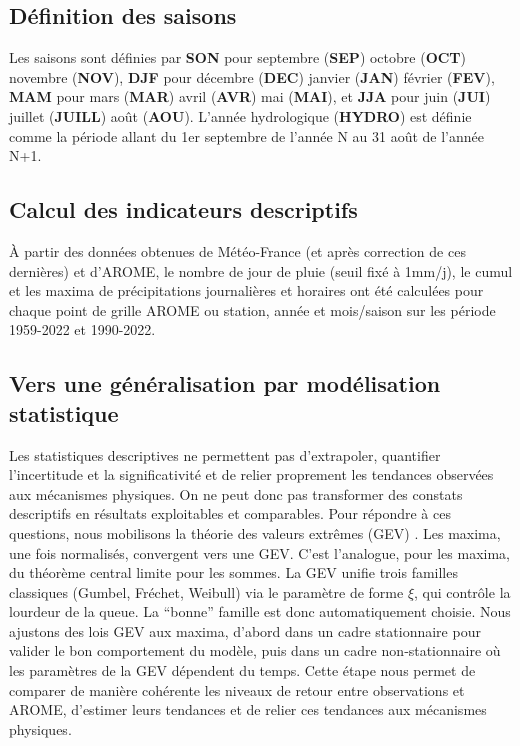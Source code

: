 \documentclass[
  article,
  nofooter,
  noheadings]{jss}
\begin{document}
\subsection{Définition des saisons}\label{duxe9finition-des-saisons}

Les saisons sont définies par \textbf{SON} pour septembre (\textbf{SEP})
octobre (\textbf{OCT}) novembre (\textbf{NOV}), \textbf{DJF} pour
décembre (\textbf{DEC}) janvier (\textbf{JAN}) février (\textbf{FEV}),
\textbf{MAM} pour mars (\textbf{MAR}) avril (\textbf{AVR}) mai
(\textbf{MAI}), et \textbf{JJA} pour juin (\textbf{JUI}) juillet
(\textbf{JUILL}) août (\textbf{AOU}). L'année hydrologique
(\textbf{HYDRO}) est définie comme la période allant du 1er septembre de
l'année N au 31 août de l'année N+1.

\subsection{Calcul des indicateurs
descriptifs}\label{calcul-des-indicateurs-descriptifs}

À partir des données obtenues de Météo-France (et après correction de
ces dernières) et d'AROME, le nombre de jour de pluie (seuil fixé à
1mm/j), le cumul et les maxima de précipitations journalières et
horaires ont été calculées pour chaque point de grille AROME ou station,
année et mois/saison sur les période 1959-2022 et 1990-2022.

\subsection{Vers une généralisation par modélisation
statistique}\label{vers-une-guxe9nuxe9ralisation-par-moduxe9lisation-statistique}

Les statistiques descriptives ne permettent pas d'extrapoler, quantifier
l'incertitude et la significativité et de relier proprement les
tendances observées aux mécanismes physiques. On ne peut donc pas
transformer des constats descriptifs en résultats exploitables et
comparables. Pour répondre à ces questions, nous mobilisons la théorie
des valeurs extrêmes (GEV) \citep{coles2001introduction}. Les maxima,
une fois normalisés, convergent vers une GEV. C'est l'analogue, pour les
maxima, du théorème central limite pour les sommes. La GEV unifie trois
familles classiques (Gumbel, Fréchet, Weibull) via le paramètre de forme
\(\xi\), qui contrôle la lourdeur de la queue. La ``bonne'' famille est
donc automatiquement choisie. Nous ajustons des lois GEV aux maxima,
d'abord dans un cadre stationnaire pour valider le bon comportement du
modèle, puis dans un cadre non‑stationnaire où les paramètres de la GEV
dépendent du temps. Cette étape nous permet de comparer de manière
cohérente les niveaux de retour entre observations et AROME, d'estimer
leurs tendances et de relier ces tendances aux mécanismes physiques.
\end{document}
